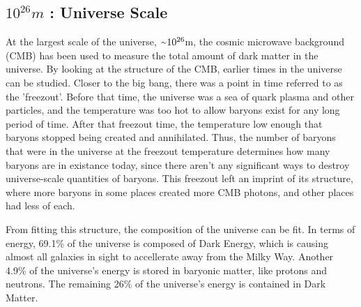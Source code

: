   \subsection{$10^{26}m$ : Universe Scale}
    At the largest scale of the universe, $\nicetilde 10^{26}$m, the cosmic microwave background (CMB) has been used to measure the total amount of dark matter in the universe.
    By looking at the structure of the CMB, earlier times in the universe can be studied.
    Closer to the big bang, there was a point in time referred to as the 'freezout'.
    Before that time, the universe was a sea of quark plasma and other particles, and the temperature was too hot to allow baryons exist for any long period of time.
    After that freezout time, the temperature low enough that baryons stopped being created and annihilated.
    Thus, the number of baryons that were in the universe at the freezout temperature determines how many baryons are in existance today, since there aren't any significant ways to destroy universe-scale quantities of baryons.
    This freezout left an imprint of its structure, where more baryons in some places created more CMB photons, and other places had less of each.

    From fitting this structure, the composition of the universe can be fit.
    In terms of energy, 69.1\% of the universe is composed of Dark Energy, which is causing almost all galaxies in sight to accellerate away from the Milky Way.
    Another 4.9\% of the universe's energy is stored in baryonic matter, like protons and neutrons.
    The remaining 26\% of the universe's energy is contained in Dark Matter\cite{planck2015}.

